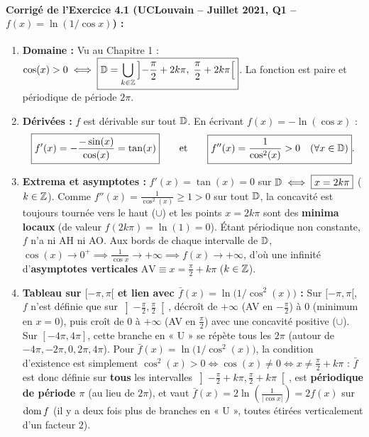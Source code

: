 \paragraph{Corrigé de l'Exercice 4.1 (UCLouvain -- Juillet 2021, Q1 -- $f(x) = \ln(1/\cos x)$) :}
\begin{enumerate}[label=(\alph*)]
    \item \textbf{Domaine :} Vu au Chapitre 1 : $\cos(x) > 0 \iff \boxed{\mathbb{D} = \bigcup_{k\in\mathbb{Z}} \left]-\frac{\pi}{2} + 2k\pi,\; \frac{\pi}{2} + 2k\pi\right[}$. La fonction est paire et périodique de période $2\pi$.
    \item \textbf{Dérivées :} $f$ est dérivable sur tout $\mathbb{D}$. En écrivant $f(x) = -\ln(\cos x)$ :
    \[
        \boxed{f'(x) = -\frac{-\sin(x)}{\cos(x)} = \tan(x)} \qquad \text{et} \qquad \boxed{f''(x) = \frac{1}{\cos^2(x)} > 0 \quad (\forall x \in \mathbb{D})}.
    \]
    \item \textbf{Extrema et asymptotes :} $f'(x) = \tan(x) = 0$ sur $\mathbb{D} \iff \boxed{x = 2k\pi}$ ($k \in \mathbb{Z}$). Comme $f''(x) = \frac{1}{\cos^2(x)} \ge 1 > 0$ sur tout $\mathbb{D}$, la concavité est toujours tournée vers le haut ($\cup$) et les points $x = 2k\pi$ sont des \textbf{minima locaux} (de valeur $f(2k\pi) = \ln(1) = 0$).
    Étant périodique non constante, $f$ n'a ni AH ni AO. Aux bords de chaque intervalle de $\mathbb{D}$, $\cos(x) \to 0^+ \implies \frac{1}{\cos x} \to +\infty \implies f(x) \to +\infty$, d'où une infinité d'\textbf{asymptotes verticales} $\boxed{\text{AV} \equiv x = \frac{\pi}{2} + k\pi}$ ($k \in \mathbb{Z}$).
    \item \textbf{Tableau sur $[-\pi, \pi[$ et lien avec $\bar{f}(x) = \ln\bigl(1/\cos^2(x)\bigr)$ :}
    Sur $[-\pi, \pi[$, $f$ n'est définie que sur $\left]-\frac{\pi}{2}, \frac{\pi}{2}\right[$, décroît de $+\infty$ (AV en $-\frac{\pi}{2}$) à $0$ (minimum en $x = 0$), puis croît de $0$ à $+\infty$ (AV en $\frac{\pi}{2}$) avec une concavité positive ($\cup$). Sur $[-4\pi, 4\pi]$, cette branche en « U » se répète tous les $2\pi$ (autour de $-4\pi, -2\pi, 0, 2\pi, 4\pi$).
    Pour $\bar{f}(x) = \ln\bigl(1/\cos^2(x)\bigr)$, la condition d'existence est simplement $\cos^2(x) > 0 \iff \cos(x) \neq 0 \iff x \neq \frac{\pi}{2} + k\pi$ : $\bar{f}$ est donc définie sur \textbf{tous} les intervalles $\left]-\frac{\pi}{2}+k\pi, \frac{\pi}{2}+k\pi\right[$, est \textbf{périodique de période $\pi$} (au lieu de $2\pi$), et vaut $\bar{f}(x) = 2\ln\left(\frac{1}{|\cos x|}\right) = 2f(x)$ sur $\operatorname{dom} f$ (il y a deux fois plus de branches en « U », toutes étirées verticalement d'un facteur $2$).
\end{enumerate}

